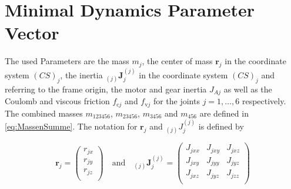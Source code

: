 
\appendices
\label{sec:Appendix}
\section{Minimal Dynamics Parameter Vector}
\label{sec:MinparamVector}

The used Parameters are the mass $m_j$, the center of mass $\boldsymbol{r}_j$ in the coordinate system $(CS)_j$, the inertia $_{(j)}\boldsymbol{J}_j^{(j)}$ in the coordinate system $(CS)_j$ and referring to the frame origin, the motor and gear inertia $J_{Aj}$ as well as the Coulomb and viscous friction $f_{\mathrm{c}j}$ and $f_{\mathrm{v}j}$ for the joints $j=1,\ldots,6$ respectively. 
The combined masses $m_{123456}$, $m_{23456}$, $m_{3456}$ and $m_{456}$ are defined in \eqref{eq:MassenSumme}.
The notation for $\boldsymbol{r}_j$ and $_{(j)}J_j^{(j)}$ is defined by

\begin{equation}
\label{eq:Komponentenschreibweise}
	\boldsymbol{r}_j = 
		\begin{pmatrix}
		r_{jx} \\
		r_{jy} \\
		r_{jz} \\
		\end{pmatrix}
	\quad
	\mathrm{and}
	\quad
	_{(j)}\boldsymbol{J}_j^{(j)} = 
		\begin{pmatrix}
		J_{jxx} & J_{jxy} & J_{jxz} \\
		J_{jxy} & J_{jyy} & J_{jyz} \\
		J_{jxz} & J_{jyz} & J_{jzz} \\
		\end{pmatrix}
\end{equation}


